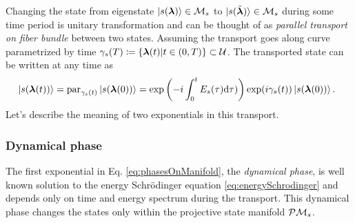 Changing the state from eigenstate $\ket{s({\bm\lambda})}\in\mathcal{M}_s$ to $\ket{s(\tilde{{\bm\lambda}})}\in\mathcal{M}_s$ during some time period is unitary transformation and can be thought of as \emph{parallel transport on fiber bundle} between two states. Assuming the transport goes along curve parametrized by time $\gamma_s(T)\coloneqq\{{\bm\lambda}(t)|t\in(0,T)\}\subset \mathcal U$. The transported state can be written at any time as
\begin{equation}
    \hspace{-5pt}\ket{s({\bm\lambda}(t))} = \textrm{par}_{\gamma_s(t)}\ket{s({\bm\lambda}(0))} = \exp\left(-i\int_0^tE_s(\tau)\mathrm{d}\tau)\right)\exp(i\gamma_s(t))\ket{s({\bm\lambda}(0))}.
    \label{eq:phasesOnManifold}
\end{equation}
Let's describe the meaning of two exponentials in this transport.
\subsubsection{Dynamical phase}
The first exponential in Eq. \ref{eq:phasesOnManifold}, the \emph{dynamical phase}, is well known solution to the energy Schr\"odinger equation \ref{eq:energySchrodinger} and depends only on time and energy spectrum during the transport. This dynamical phase changes the states only within the projective state manifold $\mathcal{P}\mathcal{M}_s$. 


